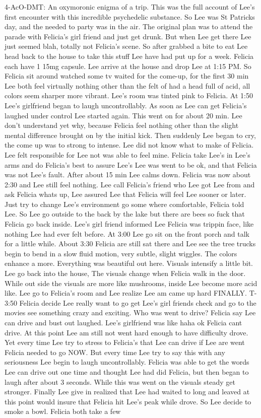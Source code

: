 \documentclass[12pt]{book}
\begin{document}
4-AcO-DMT: An oxymoronic enigma of a trip. This was the full account of Lee's first encounter with this incredible psychedelic substance. So Lee was St Patricks day, and the needed to party was in the air. The original plan was to attend the parade with Felicia's girl friend and just get drunk. But when Lee get there Lee just seemed blah, totally not Felicia's scene. So after grabbed a bite to eat Lee head back to the house to take this stuff Lee have had put up for a week. Felicia each have 1 15mg capsule. Lee arrive at the house and drop Lee at 1:15 PM. So Felicia sit around watched some tv waited for the come-up, for the first 30 min Lee both feel virtually nothing other than the felt of had a head full of acid, all colors seem sharper more vibrant. Lee's room was tinted pink to Felicia. At 1:50 Lee's girlfriend began to laugh uncontrollably. As soon as Lee can get Felicia's laughed under control Lee started again. This went on for about 20 min. Lee don't understand yet why, because Felicia feel nothing other than the slight mental difference brought on by the initial kick. Then suddenly Lee began to cry, the come up was to strong to intense. Lee did not know what to make of Felicia. Lee felt responsible for Lee not was able to feel mine. Felicia take Lee's in Lee's arms and do Felicia's best to assure Lee's Lee was went to be ok, and that Felicia was not Lee's fault. After about 15 min Lee calms down. Felicia was now about 2:30 and Lee still feel nothing. Lee call Felicia's friend who Lee got Lee from and ask Felicia whats up, Lee assured Lee that Felicia will feel Lee sooner or later. Just try to change Lee's environment go some where comfortable, Felicia told Lee. So Lee go outside to the back by the lake but there are bees so fuck that Felicia go back inside. Lee's girl friend informed Lee Felicia was trippin face, like nothing Lee had ever felt before. At 3:00 Lee go sit on the front porch and talk for a little while. About 3:30 Felicia are still sat there and Lee see the tree trucks begin to bend in a slow fluid motion, very subtle, slight wiggles. The colors enhance a more. Everything was beautiful out here. Visuals intensify a little bit. Lee go back into the house, The visuals change when Felicia walk in the door. While out side the visuals are more like mushrooms, inside Lee become more acid like. Lee go to Felicia's room and Lee realize Lee am came up hard FINALLY. T-3:50 Felicia decide Lee really want to go get Lee's girl friends check and go to the movies see something crazy and exciting. Who was went to drive? Felicia say Lee can drive and bust out laughed. Lee's girlfriend was like haha ok Felicia cant drive. At this point Lee am still not went hard enough to have difficulty drove. Yet every time Lee try to stress to Felicia's that Lee can drive if Lee are went Felicia needed to go NOW. But every time Lee try to say this with any seriousness Lee begin to laugh uncontrollably. Felicia was able to get the words Lee can drive out one time and thought Lee had did Felicia, but then began to laugh after about 3 seconds. While this was went on the visuals steady get stronger. Finally Lee give in realized that Lee had waited to long and leaved at this point would insure that Felicia hit Lee's peak while drove. So Lee decide to smoke a bowl. Felicia both take a few 
\end{document}
